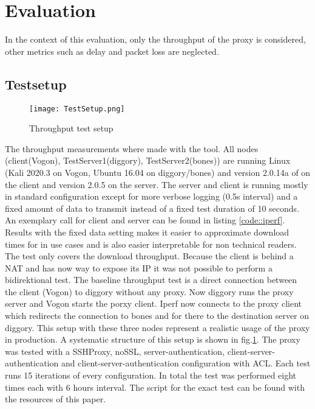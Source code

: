 \documentclass[12pt, a4paper]{scrartcl}
\begin{document}
\section{Evaluation}
In the context of this evaluation, only the throughput of the proxy is considered, other metrics such as delay and packet loss are neglected.
\subsection{Testsetup}
\begin{figure}[b]
    \centering
    \texttt{[image: TestSetup.png]}
    \caption{Throughput test setup}\label{fig::test}
\end{figure}
The throughput measurements where made with the  tool. All nodes (client(Vogon), TestServer1(diggory), TestServer2(bones)) are running Linux (Kali 2020.3 on Vogon, Ubuntu 16.04 on diggory/bones) and version 2.0.14a of  on the client and version 2.0.5 on the server. The  server and client is running mostly in standard configuration except for more verbose logging (0.5s interval) and a fixed amount of data to transmit instead of a fixed test duration of 10 seconds. An exemplary call for client and server can be found in listing \ref{code::iperf}. Results with the fixed data setting makes it easier to approximate download times for in use cases and is also easier interpretable for non technical readers.\newline
The test only covers the download throughput. Because the client is behind a NAT and has now way to expose its IP it was not possible to perform a bidirektional test.\newline
The baseline throughput test is a direct connection between the  client (Vogon) to diggory without any proxy. Now diggory runs the proxy server and Vogon starts the porxy client. Iperf now connects to the proxy client which redirects the connection to bones and for there to the destination  server on diggory. This setup with these three nodes represent a realistic usage of the proxy in production. A systematic structure of this setup is shown in fig.\@\ref{fig::test}.\newline
The proxy was tested with a SSHProxy, noSSL, server-authentication, client-server-authentication and client-server-authentication configuration with \ac{ACL}. Each test runs 15 iterations of every configuration. In total the test was performed eight times each with 6 hours interval. The script for the exact test can be found with the resources of this paper.
\end{document}
